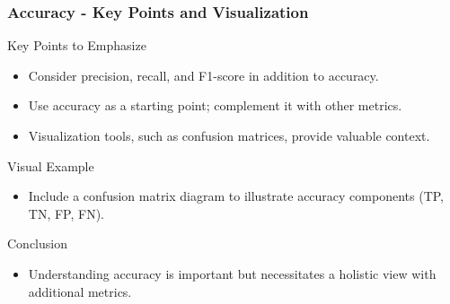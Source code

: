 \documentclass[aspectratio=169]{beamer}
\begin{document}
\begin{frame}[fragile]
    \frametitle{Accuracy - Key Points and Visualization}
    \begin{block}{Key Points to Emphasize}
        \begin{itemize}
            \item Consider precision, recall, and F1-score in addition to accuracy.
            \item Use accuracy as a starting point; complement it with other metrics.
            \item Visualization tools, such as confusion matrices, provide valuable context.
        \end{itemize}
    \end{block}

    \begin{block}{Visual Example}
        \begin{itemize}
            \item Include a confusion matrix diagram to illustrate accuracy components (TP, TN, FP, FN).
        \end{itemize}
    \end{block}

    \begin{block}{Conclusion}
        \begin{itemize}
            \item Understanding accuracy is important but necessitates a holistic view with additional metrics.
        \end{itemize}
    \end{block}
\end{frame}
\end{document}
